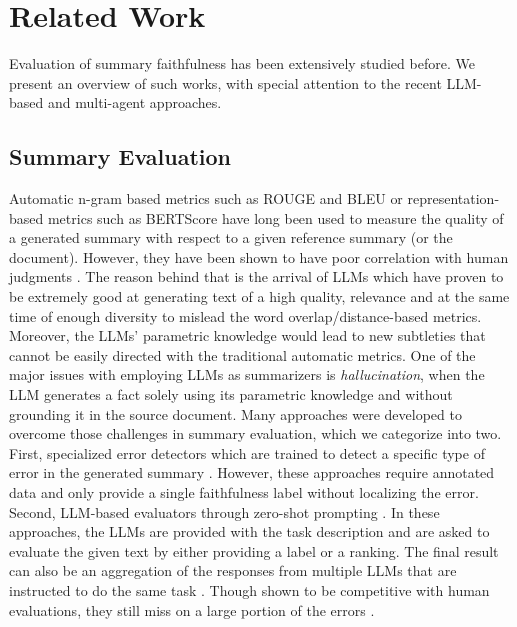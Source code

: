 \section{Related Work}
Evaluation of summary faithfulness has been extensively studied before. We present an overview of such works, with special attention to the recent LLM-based and multi-agent approaches.

\subsection{Summary Evaluation}

Automatic n-gram based metrics such as ROUGE \cite{lin2004rouge} and BLEU \cite{papineni2002bleu} or representation-based metrics such as BERTScore \cite{zhang2020bertscoreevaluatingtextgeneration} have long been used to measure the quality of a generated summary with respect to a given reference summary (or the document). However, they have been shown to have poor correlation with human judgments \cite{gao-wan-2022-dialsummeval,Tang2023.04.22.23288967}. The reason behind that is the arrival of LLMs which have proven to be extremely good at generating text of a high quality, relevance and at the same time of enough diversity to mislead the word overlap/distance-based metrics. Moreover, the LLMs' parametric knowledge would lead to new subtleties that cannot be easily directed with the traditional automatic metrics. One of the major issues with employing LLMs as summarizers is {\it hallucination}, when the LLM generates a fact solely using its parametric knowledge and without grounding it in the source document.
Many approaches were developed to overcome those challenges in summary evaluation, which we categorize into two.
First, specialized error detectors which are trained to detect a specific type of error in the generated summary \cite{kryscinski2020evaluating, fabbri2022qafacteval, goyal2020evaluating, clark2023seahorse, tang2024minicheck}. However, these approaches require annotated data and only provide a single faithfulness label without localizing the error.
 Second, LLM-based evaluators through zero-shot prompting \cite{luo2023chatgptfactualinconsistencyevaluator, wang2023factcheck}. In these approaches, the LLMs are provided with the task description and are asked to evaluate the given text by either providing a label or a ranking. The final result can also be an aggregation of the responses from multiple LLMs that are instructed to do the same task \cite{verga2024replacing}.
 Though shown to be competitive with human evaluations, they still miss on a large portion of the errors \cite{tang2024minicheck,tang2024tofueval}.


